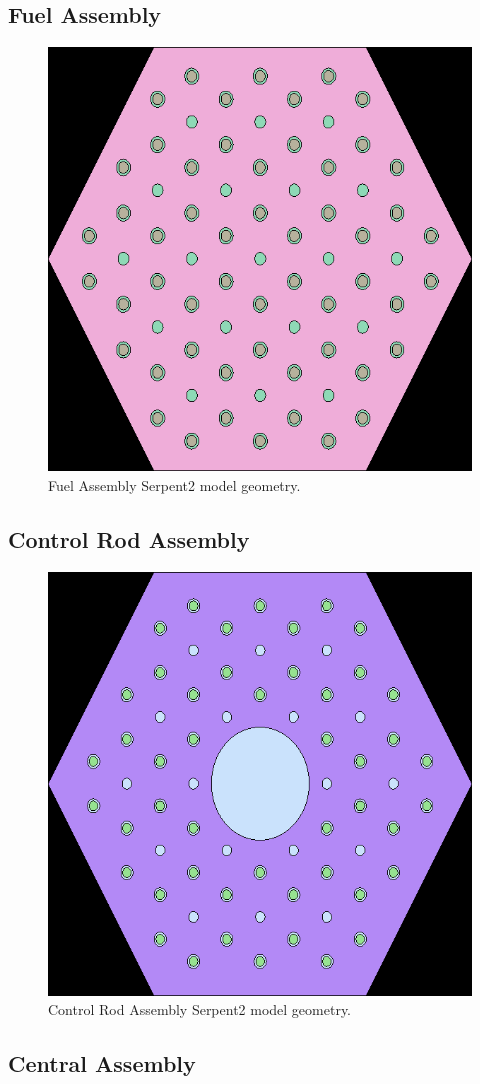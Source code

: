 \documentclass[11pt,letterpaper]{article}
\begin{document}
\subsection{Fuel Assembly}
\label{sub:FuelAssembly}

\begin{figure}[H]
	\centering
	\includegraphics[width=0.45\linewidth]{figures/fuel_block_geom1.png} 
	\hfill
	\caption{Fuel Assembly Serpent2 model geometry.}
	\label{fig:FuelAssembly}
\end{figure}

\subsection{Control Rod Assembly}
\label{sub:ControlRodAssembly}

\begin{figure}[H]
	\centering
	\includegraphics[width=0.45\linewidth]{figures/control_block_geom1.png} 
	\hfill
	\caption{Control Rod Assembly Serpent2 model geometry.}
	\label{fig:ControlRodAssembly}
\end{figure}

\subsection{Central Assembly}
\label{sub:CentralAssembly}
\end{document}
